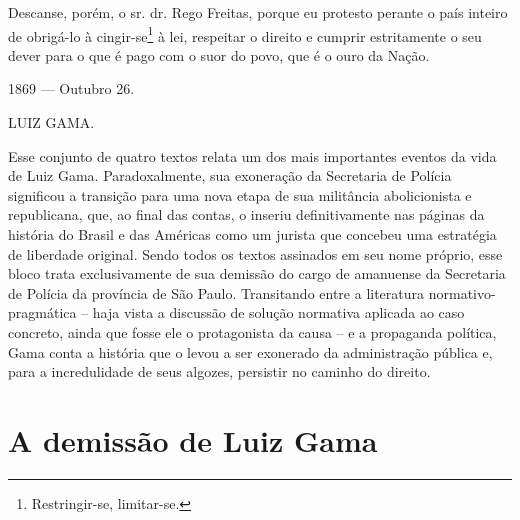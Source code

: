 Descanse, porém, o sr. dr. Rego Freitas, porque eu protesto perante o
país inteiro de obrigá-lo à cingir-se\footnote{Restringir-se,
  limitar-se.} à lei,
respeitar o direito e cumprir estritamente o seu dever para o que é pago
com o suor do povo, que é o ouro da Nação.

1869 --- Outubro 26.

LUIZ GAMA.

\pagebreak
\mbox{}\vfill
\thispagestyle{empty}

{\small\noindent
Esse conjunto de quatro textos relata um dos mais importantes
eventos da vida de Luiz Gama. Paradoxalmente, sua exoneração da
Secretaria de Polícia significou a transição para uma nova etapa de sua
militância abolicionista e republicana, que, ao final das contas, o
inseriu definitivamente nas páginas da história do Brasil e das Américas
como um jurista que concebeu uma estratégia de liberdade original. Sendo
todos os textos assinados em seu nome próprio, esse bloco trata
exclusivamente de sua demissão do cargo de amanuense da Secretaria de
Polícia da província de São Paulo. Transitando entre a literatura
normativo-pragmática -- haja vista a discussão de solução normativa
aplicada ao caso concreto, ainda que fosse ele o protagonista da causa
-- e a propaganda política, Gama conta a história que o levou a ser
exonerado da administração pública e, para a incredulidade de seus
algozes, persistir no caminho do direito.}

\part{A demissão de Luiz Gama}

\pagebreak
\mbox{}\vfill
\thispagestyle{empty}

